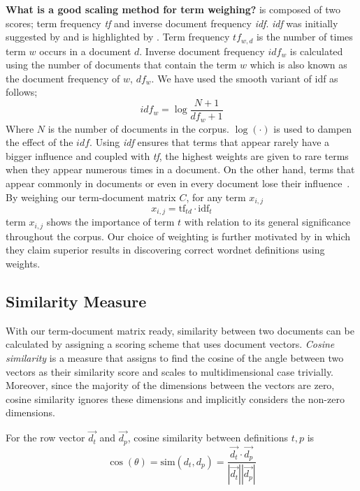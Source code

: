 \textbf{What is a good scaling method for term weighing?}
\tfidf{} is composed of two scores; term frequency \emph{tf} and inverse document frequency \emph{idf}.
\emph{idf} was initially suggested by \textcite{jones_statistical_1972} and is highlighted by \textcite{manning_introduction_2009}.
Term frequency $tf_{w,d}$ is the number of times term $w$ occurs in a document $d$.
Inverse document frequency $idf_{w}$ is calculated using the number of documents that contain the term $w$ which is also known as the document frequency of $w$, $df_w$.
We have used the smooth variant of idf as follows;
\begin{equation}
    idf_w = \log{\frac{N + 1}{df_w + 1}}
\end{equation}
Where $N$ is the number of documents in the corpus. $\log(\cdot)$ is used to dampen the effect of the $idf$.
Using \emph{idf} ensures that terms that appear rarely have a bigger influence and coupled with \emph{tf}, the highest weights are given to rare terms when they appear numerous times in a document.
On the other hand, terms that appear commonly in documents or even in every document lose their influence~\cite{manning_introduction_2009}.
By weighing our term-document matrix $C$, for any term $x_{i,j}$
\begin{equation}
x_{i,j} = \text{tf}_{td} \cdot \text{idf}_{t} \end{equation}
term $x_{i,j}$ shows the importance of term $t$ with relation to its general significance throughout the corpus.
Our choice of \tfidf{} weighting is further motivated by \textcite{ruiz-casado_automatic_2005} in which they claim superior results in discovering correct wordnet definitions using \tfidf{} weights.

\subsection{Similarity Measure}%
\label{sub:similarity_measure}

With our term-document matrix ready, similarity between two documents can be calculated by assigning a scoring scheme that uses document vectors.
\emph{Cosine similarity} is a measure that assigns to find the cosine of the angle between two vectors as their similarity score and scales to multidimensional case trivially.
Moreover, since the majority of the dimensions between the vectors are zero, cosine similarity ignores these dimensions and implicitly considers the non-zero dimensions.

For the row vector $\vec{d_t}$ and $\vec{d_p}$, cosine similarity between definitions $t, p$ is
\begin{equation}
    \cos(\theta) = \text{sim}(d_t, d_p) = \frac{\vec{d_t} \cdot \vec{d_p}}{|\vec{d_t}||\vec{d_p}|}
\end{equation}

